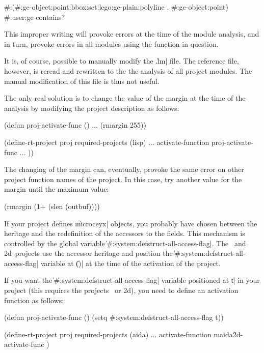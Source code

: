 \begin{Longcode*}
#:(#:ge-object:point:bbox:set:lego:ge-plain:polyline . #:ge-object:point)
#:user:ge-contains?
\end{Longcode*}


This improper writing will provoke errors at the time of the module analysis, and in turn, provoke errors in all modules using the function in question.

It is, of course, possible to manually modify the \|.lm| file.  The reference file, however, is reread and rewritten to the the analysis of all project modules.  The manual modification of this file is thus not useful.

The only real solution is to change the value of the margin at the time of the analysis by modifying the project description as follows:

\begin{Code*}
(defun proj-activate-func ()
  ...
  (rmargin 255))

(define-rt-project proj
    required-projects (lisp)	
    ...
    activate-function proj-activate-func
    ...
    ))
\end{Code*}

The changing of the margin can, eventually, provoke the same error on other project function names of the project.  In this case, try another value for the margin until the maximum value:

\begin{Code*}
(rmargin (1+ (slen (outbuf))))
\end{Code*}



If your project defines \|microceyx| objects, you probably have chosen between the heritage and the redefinition of the accessors to the fields.  This mechanism is controlled by the global variable \|#:system:defstruct-all-access-flag|.  The \Aida\ and \Masai2d\ projects use the accessor heritage and position the \|#:system:defstruct-all-access-flag| variable at \|()| at the time of the activation of the project. 

If you want the \|#:system:defstruct-all-access-flag| variable 
positioned at \|t| in your project (this requires the projects \Aida\ or \Masai2d), you need to define an activation function as follows:

\begin{Code*}
(defun proj-activate-func ()
  (setq #:system:defstruct-all-access-flag t))		     

(define-rt-project proj
  required-projects (aida)	
  ...
  activate-function maida2d-activate-func
  )
\end{Code*}

